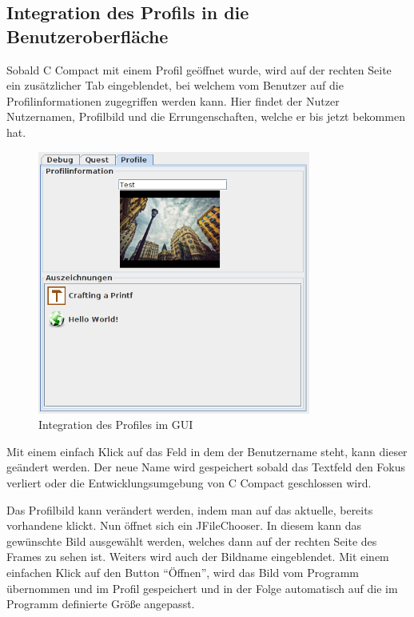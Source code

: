 \iffabian
\else
	\subsection{Integration des Profils in die Benutzeroberfläche}
\fi

Sobald C Compact mit einem Profil geöffnet wurde, wird auf der rechten Seite ein zusätzlicher Tab eingeblendet, bei welchem vom Benutzer auf die Profilinformationen zugegriffen werden kann. Hier findet der Nutzer Nutzernamen, Profilbild und die Errungenschaften, welche er bis jetzt bekommen hat.

\begin{figure}[h] 
  \centering
     \includegraphics[width=0.8\textwidth]{./media/images/gui/profile.png}
  \caption{Integration des Profiles im GUI}
  \label{fig:profile_gui}
\end{figure}


Mit einem einfach Klick auf das Feld in dem der Benutzername steht, kann dieser geändert werden. Der neue Name wird gespeichert sobald das Textfeld den Fokus verliert oder die Entwicklungsumgebung von C Compact geschlossen wird.

Das Profilbild kann verändert werden, indem man auf das aktuelle, bereits vorhandene klickt. Nun öffnet sich ein JFileChooser. In diesem kann das gewünschte Bild ausgewählt werden, welches dann auf der rechten Seite des Frames zu sehen ist. Weiters wird auch der Bildname eingeblendet. Mit einem einfachen Klick auf den Button "`Öffnen"', wird das Bild vom Programm übernommen und im Profil gespeichert und in der Folge automatisch auf die im Programm definierte Größe angepasst.

